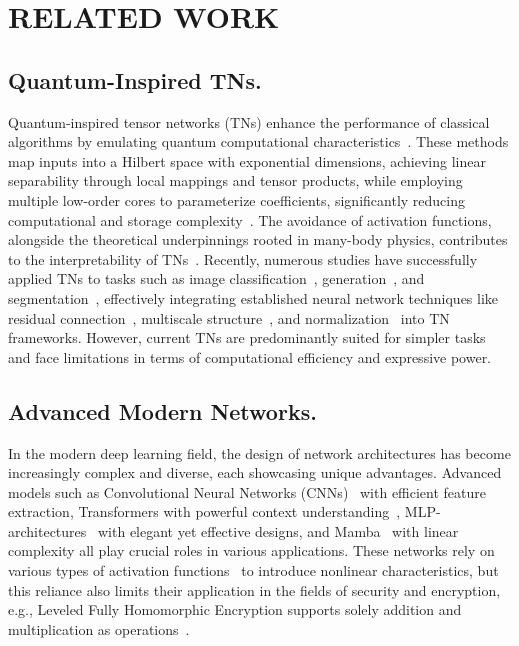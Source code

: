 \section{RELATED WORK}
\subsection{Quantum-Inspired TNs.}
Quantum-inspired tensor networks (TNs) enhance the performance of classical algorithms by emulating quantum computational characteristics~\citep{huggins2019towards}. These methods map inputs into a Hilbert space with exponential dimensions, achieving linear separability through local mappings and tensor products, while employing multiple low-order cores to parameterize coefficients, significantly reducing computational and storage complexity~\citep{selvan2020tensor,stoudenmire2016supervised}. The avoidance of activation functions, alongside the theoretical underpinnings rooted in many-body physics, contributes to the interpretability of TNs~\citep{ran2023tensor}. Recently, numerous studies have successfully applied TNs to tasks such as image classification~\citep{stoudenmire2016supervised}, generation~\citep{cheng2019tree}, and segmentation~\citep{selvan2021patch}, effectively integrating established neural network techniques like residual connection~\citep{meng2023residual}, multiscale structure~\citep{liu2019machine}, and normalization~\citep{selvan2020tensor} into TN frameworks.
However, current TNs are predominantly suited for simpler tasks and face limitations in terms of computational efficiency and expressive power.


\subsection{Advanced Modern Networks.}
In the modern deep learning field, the design of network architectures has become increasingly complex and diverse, each showcasing unique advantages. Advanced models such as Convolutional Neural Networks (CNNs)~\citep{ref31,hou2024conv2former} with efficient feature extraction, Transformers with powerful context understanding~\citep{vaswani2017attention}, MLP-architectures~\citep{tolstikhin2021mlp} with elegant yet effective designs, and Mamba~\citep{gu2023mamba} with linear complexity all play crucial roles in various applications. These networks rely on various types of activation functions~\citep{apicella2021survey} to introduce nonlinear characteristics, but this reliance also limits their application in the fields of security and encryption, e.g., Leveled Fully Homomorphic Encryption supports solely addition and multiplication as operations~\citep{brakerski2014leveled,cheng2024multilinear}.

